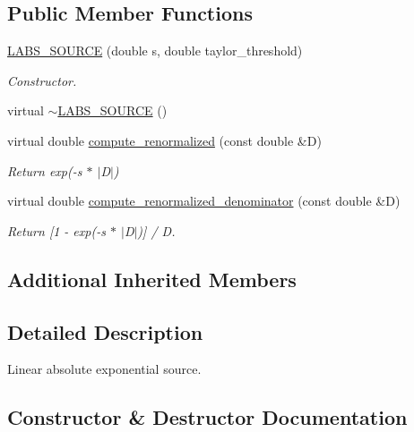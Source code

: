 \subsection*{Public Member Functions}
\begin{DoxyCompactItemize}
\item 
\mbox{\hyperlink{classforte_1_1_l_a_b_s___s_o_u_r_c_e_adf51d48d65d02aed8b783e2fe077f023}{L\+A\+B\+S\+\_\+\+S\+O\+U\+R\+CE}} (double s, double taylor\+\_\+threshold)
\begin{DoxyCompactList}\small\item\em Constructor. \end{DoxyCompactList}\item 
virtual \mbox{\hyperlink{classforte_1_1_l_a_b_s___s_o_u_r_c_e_a1ab151f0098d4007e64cbeb2cd319e4f}{$\sim$\+L\+A\+B\+S\+\_\+\+S\+O\+U\+R\+CE}} ()
\item 
virtual double \mbox{\hyperlink{classforte_1_1_l_a_b_s___s_o_u_r_c_e_a62a2509bdacd3a8456684b90ba6def30}{compute\+\_\+renormalized}} (const double \&D)
\begin{DoxyCompactList}\small\item\em Return exp(-\/s $\ast$ $\vert$\+D$\vert$) \end{DoxyCompactList}\item 
virtual double \mbox{\hyperlink{classforte_1_1_l_a_b_s___s_o_u_r_c_e_a2bb2384aa4d711db4c3116e466d56835}{compute\+\_\+renormalized\+\_\+denominator}} (const double \&D)
\begin{DoxyCompactList}\small\item\em Return \mbox{[}1 -\/ exp(-\/s $\ast$ $\vert$\+D$\vert$)\mbox{]} / D. \end{DoxyCompactList}\end{DoxyCompactItemize}
\subsection*{Additional Inherited Members}


\subsection{Detailed Description}
Linear absolute exponential source. 

\subsection{Constructor \& Destructor Documentation}
\mbox{\label{classforte_1_1_l_a_b_s___s_o_u_r_c_e_adf51d48d65d02aed8b783e2fe077f023}} 
